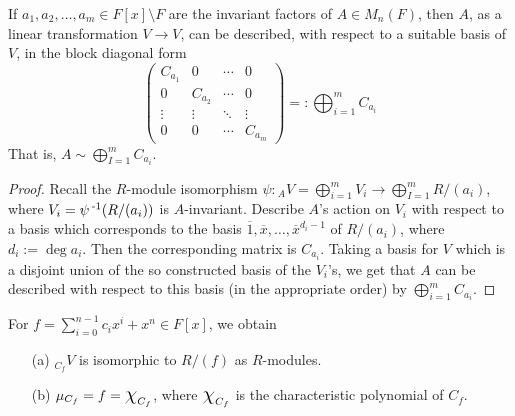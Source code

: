 \documentclass[11pt]{book}
\theoremstyle{definition}   \newtheorem{defn}[counter]{Definition} %
\newcommand{\ov}{\overline}   \newcommand{\wt}{\widetilde}
\newcommand{\bs}{\setminus}   \newcommand{\A}{\mathcal{A}}   \newcommand{\sy}{\textnormal{Syl}}   \newcommand{\size}[1]{\left| #1 \right|}
\newcommand{\mymatrix}[2]{\left( \begin{array}{#1} #2 \end{array} \right)}
\newcommand{\Chi}{\mbox{\Large $\chi$}}
\DeclareMathOperator{\ra}{\rightarrow}   \DeclareMathOperator{\Poly}{\mathbf{P}}   \DeclareMathOperator{\spn}{\textnormal{span}}   \DeclareMathOperator{\aut}{\textnormal{Aut}}
\newcommand{\vs}{\vspace{8pt}}   \newcommand{\hs}{\hspace{8pt}}
\numberwithin{counter}{chapter}
\begin{document}
\vs

\begin{corollary}
If $a_1,a_2,\dots,a_m \in F[x]\bs F$ are the invariant factors of $A \in M_n(F)$, then $A$, as a linear transformation $V \ra V$, can be described, with respect to a suitable basis of $V$, in the block diagonal form
	\[\mymatrix{cccc}{C_{a_1} & 0 & \cdots & 0 \\
	                  0 & C_{a_2} & \cdots & 0 \\
	                  \vdots & \vdots & \ddots & \vdots \\
	                  0 & 0 & \cdots & C_{a_m}} =: \bigoplus_{i=1}^m C_{a_i} \]
That is, $A \sim \bigoplus_{I=1}^m C_{a_i}$.
\end{corollary}

\begin{proof}
Recall the $R$-module isomorphism $\psi : {_AV} = \bigoplus_{i=1}^m V_i \ra \bigoplus_{I=1}^m R/(a_i)$, where $V_i = \psi\operatorname{^{-1}}(R/(a_i))$ is $A$-invariant. Describe $A$'s action on $V_i$ with respect to a basis which corresponds to the basis $\ov{1},\ov{x},\dots,\ov{x}^{d_{i} - 1}$ of $R/(a_i)$, where $d_i := \deg a_i$. Then the corresponding matrix is $C_{a_i}$. Taking a basis for $V$ which is a disjoint union of the so constructed basis of the $V_i$'s, we get that $A$ can be described with respect to this basis (in the appropriate order) by $\bigoplus_{i=1}^m C_{a_i}$.
\end{proof}

\vs

\begin{lemma}
For $f = \sum_{i=0}^{n-1} c_i x^i + x^n \in F[x]$, we obtain
\begin{enumerate}
\item[(a)] $_{C_f}V$ is isomorphic to $R/(f)$ as $R$-modules.
\item[(b)] $\mu_{C_f} = f = \Chi_{C_f}$, where $\Chi_{C_f}$ is the characteristic polynomial of $C_f$.
\end{enumerate}
\end{lemma}
\end{document}
